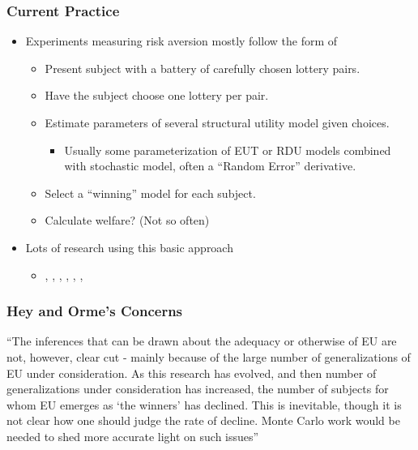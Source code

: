 \documentclass{beamer}
\begin{document}
\begin{frame}
\frametitle{Current Practice}
\begin{itemize}
	\item Experiments measuring risk aversion mostly follow the form of \textcite{Hey1994}
		\begin{itemize}
			\item Present subject with a battery of carefully chosen lottery pairs.
			\item Have the subject choose one lottery per pair.
			\item Estimate parameters of several structural utility model given choices.
				\begin{itemize}
					\item Usually some parameterization of EUT or RDU models combined with stochastic model, often a \enquote{Random Error} derivative.
				\end{itemize}
			\item Select a \enquote{winning} model for each subject.
			\item Calculate welfare? (Not so often)
		\end{itemize}
	\item Lots of research using this basic approach
		\begin{itemize}
			\item \textcite{Hey1994, Hey1995, Hey2001}, \textcite{Loomes1995, Loomes1998}, \textcite{Conte2011}, \textcite{Harrison2005}, \textcite{Harrison2005a}, \textcite{Harrison2008}, \textcite{Harrison2016} 
		\end{itemize}
\end{itemize}
\end{frame}

\begin{frame}
\frametitle{Hey and Orme's Concerns}
\enquote{The inferences that can be drawn \textelp{} about the adequacy or otherwise of EU are not, however, clear cut - mainly because of the large number of generalizations of EU under consideration.
As this research has evolved, and then number of generalizations under consideration has increased, the number of subjects for whom EU emerges as \enquote{the winners} has declined. 
This is inevitable, though it is not clear how one should judge the rate of decline.
\textelp{} Monte Carlo work would be needed to shed more accurate light on such issues}
\end{frame}
\end{document}
